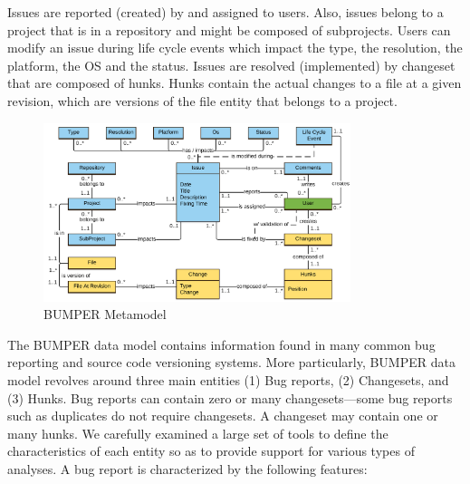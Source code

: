 \documentclass{sig-alternate-05-2015}
\begin{document}
Issues are reported (created) by and assigned to users.
Also, issues belong to a project that is in a repository and might be composed
of subprojects.
Users can modify an issue during life cycle events which impact the type,
the resolution, the platform, the OS and the status.
Issues are resolved (implemented) by changeset that are composed of hunks.
Hunks contain the actual changes to a file at a given revision,
which are versions of the file entity that belongs to a project.


\begin{figure}
  \centering
  \includegraphics[width=0.8\textwidth]{media/Bumper-Model.png}
  \caption{BUMPER Metamodel\label{fig:bumper-metamodel}}
\end{figure}

The BUMPER data model contains information found
in many common bug reporting and source code versioning
systems. More particularly, BUMPER data model revolves
around three main entities (1) Bug reports, (2) Changesets,
and (3) Hunks. Bug reports can contain zero or many
changesets---some bug reports such as duplicates do not
require changesets. A changeset may contain one or many
hunks. We carefully examined a large set of tools to define
the characteristics of each entity so as to provide support
for various types of analyses.
A bug report is characterized by the following features:
\end{document}
